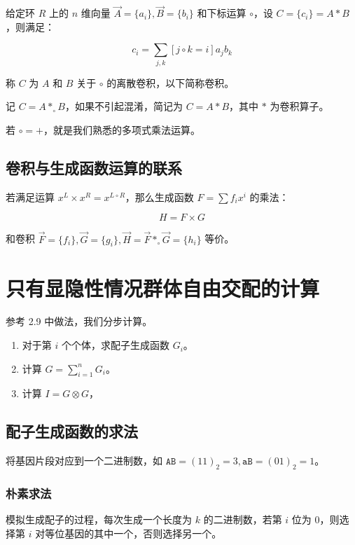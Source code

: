 \documentclass{article}
\begin{document}
给定环 $R$ 上的 $n$ 维向量 $\vec A=\{a_i\},\vec B=\{b_i\}$ 和下标运算 $\circ$，设 $C=\{c_i\}=A*B$，则满足：

\begin{equation}
	c_i=\sum_{j,k} [j \circ k=i] a_jb_k \label{(1)}
\end{equation}

称 $C$ 为 $A$ 和 $B$ 关于 $\circ$ 的离散卷积，以下简称卷积。

记 $C=A*_{\circ}B$，如果不引起混淆，简记为 $C=A*B$，其中 $*$ 为卷积算子。

若 $\circ = +$，就是我们熟悉的多项式乘法运算。

\subsection{卷积与生成函数运算的联系}

若满足运算 $x^L \times x^R = x^{L \circ R}$，那么生成函数 $F=\sum f_i x^i$ 的乘法：

$$H=F \times G$$

和卷积 $\vec F=\{f_i\},\vec G=\{g_i\},\vec H=\vec F *_{\circ} \vec G=\{h_i\}$ 等价。

\section{只有显隐性情况群体自由交配的计算}

参考 2.9 中做法，我们分步计算。

\begin{enumerate}
	\item 对于第 $i$ 个个体，求配子生成函数 $G_i$。
	\item 计算 $G=\sum_{i=1}^n G_i$。 
	\item 计算 $I=G \otimes G$，
\end{enumerate}

\subsection{配子生成函数的求法}

将基因片段对应到一个二进制数，如 $\texttt{AB}=(11)_2=3,\texttt{aB}=(01)_2=1$。

\subsubsection*{朴素求法}

模拟生成配子的过程，每次生成一个长度为 $k$ 的二进制数，若第 $i$ 位为 $0$，则选择第 $i$ 对等位基因的其中一个，否则选择另一个。
\end{document}
